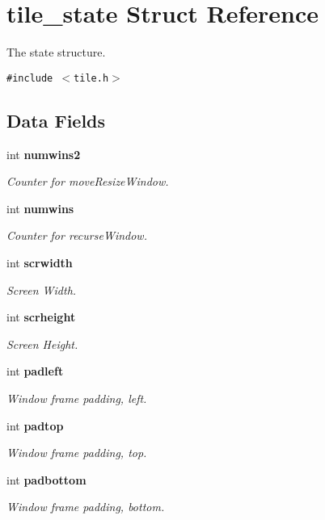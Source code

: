 \section{tile\_\-state Struct Reference}
\label{structtile__state}
The state structure.  


{\tt \#include $<$tile.h$>$}

\subsection*{Data Fields}
\begin{CompactItemize}
\item 
int {\bf numwins2}
\begin{CompactList}\small\item\em Counter for move\-Resize\-Window. \item\end{CompactList}\item 
int {\bf numwins}
\begin{CompactList}\small\item\em Counter for recurse\-Window. \item\end{CompactList}\item 
int {\bf scrwidth}
\begin{CompactList}\small\item\em Screen Width. \item\end{CompactList}\item 
int {\bf scrheight}
\begin{CompactList}\small\item\em Screen Height. \item\end{CompactList}\item 
int {\bf padleft}
\begin{CompactList}\small\item\em Window frame padding, left. \item\end{CompactList}\item 
int {\bf padtop}
\begin{CompactList}\small\item\em Window frame padding, top. \item\end{CompactList}\item 
int {\bf padbottom}
\begin{CompactList}\small\item\em Window frame padding, bottom. \item\end{CompactList}\item 

\end{CompactItemize}
